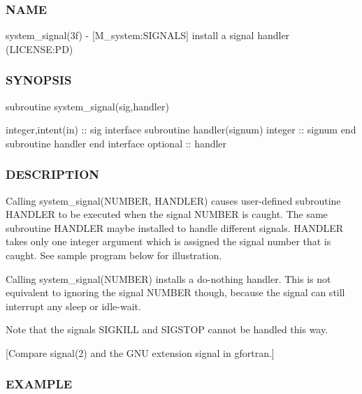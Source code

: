 \subsubsection*{N\+A\+ME}

system\+\_\+signal(3f) -\/ \mbox{[}M\+\_\+system\+:S\+I\+G\+N\+A\+LS\mbox{]} install a signal handler (L\+I\+C\+E\+N\+SE\+:PD) 

\subsubsection*{S\+Y\+N\+O\+P\+S\+IS}

\begin{DoxyVerb} subroutine system_signal(sig,handler)

    integer,intent(in) :: sig
    interface
      subroutine handler(signum)
      integer :: signum
      end subroutine handler
    end interface
    optional :: handler
\end{DoxyVerb}


\subsubsection*{D\+E\+S\+C\+R\+I\+P\+T\+I\+ON}

\begin{DoxyVerb}Calling system_signal(NUMBER, HANDLER) causes user-defined
subroutine HANDLER to be executed when the signal NUMBER is
caught. The same subroutine HANDLER maybe installed to handle
different signals. HANDLER takes only one integer argument which
is assigned the signal number that is caught. See sample program
below for illustration.

Calling system_signal(NUMBER) installs a do-nothing handler. This
is not equivalent to ignoring the signal NUMBER though, because
the signal can still interrupt any sleep or idle-wait.

Note that the signals SIGKILL and SIGSTOP cannot be handled
this way.

[Compare signal(2) and the GNU extension signal in gfortran.]
\end{DoxyVerb}


\subsubsection*{E\+X\+A\+M\+P\+LE}

